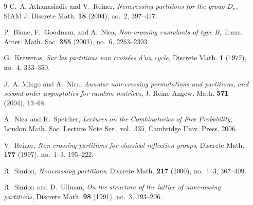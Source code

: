 \documentclass[11pt]{article}
\theoremstyle{definition}
\begin{document}
\begin{thebibliography}{9}
C.~A. Athanasiadis and V.~Reiner, \emph{Noncrossing partitions for the group $D_n$}, SIAM J. Discrete Math. \textbf{18} (2004), no.~2, 397--417.

P.~Biane, F.~Goodman, and A.~Nica, \emph{Non-crossing cumulants of type B}, Trans. Amer. Math. Soc. \textbf{355} (2003), no.~6, 2263--2303.

G.~Kreweras, \emph{Sur les partitions non crois\'ees d'un cycle}, Discrete Math. \textbf{1} (1972), no.~4, 333--350.

J.~A. Mingo and A.~Nica, \emph{Annular non-crossing permutations and partitions, and second-order asymptotics for random matrices}, J. Reine Angew. Math. \textbf{571} (2004), 13--68.

A.~Nica and R.~Speicher, \emph{Lectures on the Combinatorics of Free Probability}, London Math. Soc. Lecture Note Ser., vol.~335, Cambridge Univ. Press, 2006.

V.~Reiner, \emph{Non-crossing partitions for classical reflection groups}, Discrete Math. \textbf{177} (1997), no.~1--3, 195--222.

R.~Simion, \emph{Noncrossing partitions}, Discrete Math. \textbf{217} (2000), no.~1--3, 367--409.

R.~Simion and D.~Ullman, \emph{On the structure of the lattice of noncrossing partitions}, Discrete Math. \textbf{98} (1991), no.~3, 193--206.
\end{thebibliography}
\end{document}

